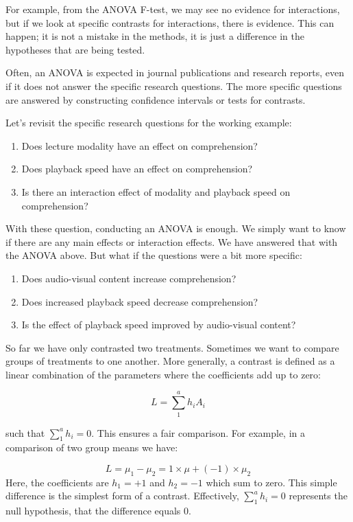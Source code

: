 \documentclass[
  letterpaper,
]{book}
\providecommand{\tightlist}{%
  \setlength{\itemsep}{0pt}\setlength{\parskip}{0pt}}\usepackage{longtable,booktabs,array}
\begin{document}
For example, from the ANOVA F-test, we may see no evidence for
interactions, but if we look at specific contrasts for interactions,
there is evidence. This can happen; it is not a mistake in the methods,
it is just a difference in the hypotheses that are being tested.

Often, an ANOVA is expected in journal publications and research
reports, even if it does not answer the specific research questions. The
more specific questions are answered by constructing confidence
intervals or tests for contrasts.

Let's revisit the specific research questions for the working example:

\begin{enumerate}
\def\labelenumi{\arabic{enumi}.}
\tightlist
\item
  Does lecture modality have an effect on comprehension?
\item
  Does playback speed have an effect on comprehension?
\item
  Is there an interaction effect of modality and playback speed on
  comprehension?
\end{enumerate}

With these question, conducting an ANOVA is enough. We simply want to
know if there are any main effects or interaction effects. We have
answered that with the ANOVA above. But what if the questions were a bit
more specific:

\begin{enumerate}
\def\labelenumi{\arabic{enumi}.}
\tightlist
\item
  Does audio-visual content increase comprehension?
\item
  Does increased playback speed decrease comprehension?
\item
  Is the effect of playback speed improved by audio-visual content?
\end{enumerate}

So far we have only contrasted two treatments. Sometimes we want to
compare groups of treatments to one another. More generally, a contrast
is defined as a linear combination of the parameters where the
coefficients add up to zero:

\[L = \sum_1^a h_iA_i\]

such that \(\sum_1^a h_i = 0\). This ensures a fair comparison. For
example, in a comparison of two group means we have:

\[ L = \mu_1 - \mu_2 = 1\times \mu + (-1) \times \mu_2\] Here, the
coefficients are \(h_1 = +1\) and \(h_2 = -1\) which sum to zero. This
simple difference is the simplest form of a contrast. Effectively,
\(\sum_1^a h_i = 0\) represents the null hypothesis, that the difference
equals 0.
\end{document}
